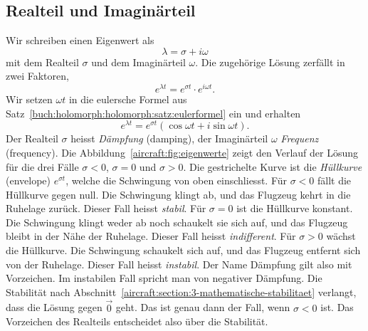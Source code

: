 \subsection{Realteil und Imaginärteil
\label{aircraft:subsection:realteil-imaginaerteil}}
Wir schreiben einen Eigenwert als
\begin{equation}
    \lambda
    =
    \sigma + i\omega
    \label{aircraft:eqn:zerlegung}
\end{equation}
mit dem Realteil $\sigma$ und dem Imaginärteil $\omega$.
Die zugehörige Lösung zerfällt in zwei Faktoren,
\begin{equation}
    e^{\lambda t}
    =
    e^{\sigma t} \cdot e^{i\omega t}.
    \label{aircraft:eqn:faktoren}
\end{equation}
Wir setzen $\omega t$ in die eulersche Formel aus
Satz~\ref{buch:holomorph:holomorph:satz:eulerformel} ein und erhalten
\begin{equation}
    e^{\lambda t}
    =
    e^{\sigma t} (\cos\omega t + i\sin\omega t).
    \label{aircraft:eqn:euler}
\end{equation}
Der Realteil $\sigma$ heisst \emph{Dämpfung} (damping),
%
der Imaginärteil $\omega$ \emph{Frequenz} (frequency).
%
Die Abbildung~\ref{aircraft:fig:eigenwerte} zeigt den Verlauf der Lösung für
die drei Fälle $\sigma < 0$, $\sigma = 0$ und $\sigma > 0$.
Die gestrichelte Kurve ist die \emph{Hüllkurve} (envelope) $e^{\sigma t}$,
%
welche die Schwingung von oben einschliesst.
Für $\sigma < 0$ fällt die Hüllkurve gegen null.
Die Schwingung klingt ab, und das Flugzeug kehrt in die Ruhelage zurück.
Dieser Fall heisst \emph{stabil}.
%
Für $\sigma = 0$ ist die Hüllkurve konstant.
Die Schwingung klingt weder ab noch schaukelt sie sich auf, und das Flugzeug
bleibt in der Nähe der Ruhelage.
Dieser Fall heisst \emph{indifferent}.
%
Für $\sigma > 0$ wächst die Hüllkurve.
Die Schwingung schaukelt sich auf, und das Flugzeug entfernt sich
von der Ruhelage.
Dieser Fall heisst \emph{instabil}.
%
Der Name Dämpfung gilt also mit Vorzeichen.
Im instabilen Fall spricht man von negativer Dämpfung.
Die Stabilität nach Abschnitt~\ref{aircraft:section:3-mathematische-stabilitaet}
verlangt,
dass die Lösung gegen $\vec 0$ geht.
Das ist genau dann der Fall, wenn $\sigma < 0$ ist.
Das Vorzeichen des Realteils entscheidet also über die Stabilität.



